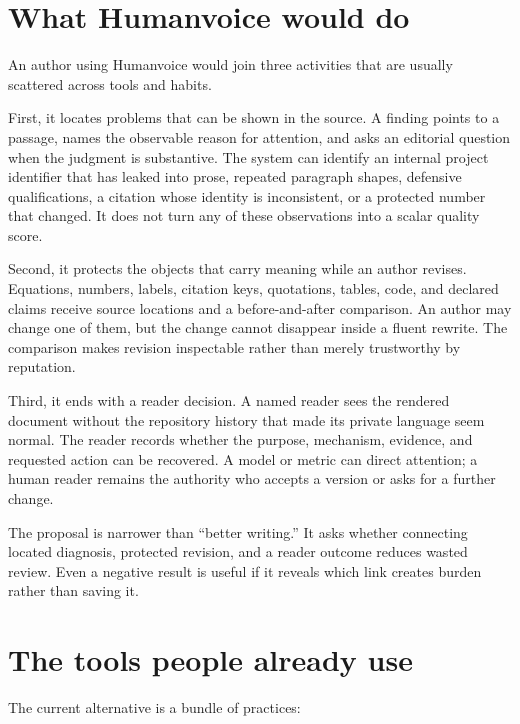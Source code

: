 \section{What Humanvoice would do}

An author using Humanvoice would join three activities that are usually
scattered across tools and habits.

First, it locates problems that can be shown in the source. A finding points to
a passage, names the observable reason for attention, and asks an editorial
question when the judgment is substantive. The system can identify an internal
project identifier that has leaked into prose, repeated paragraph shapes,
defensive qualifications, a citation whose identity is inconsistent, or a
protected number that changed. It does not turn any of these observations into
a scalar quality score.

Second, it protects the objects that carry meaning while an author revises.
Equations, numbers, labels, citation keys, quotations, tables, code, and
declared claims receive source locations and a before-and-after comparison. An
author may change one of them, but the change cannot disappear inside a fluent
rewrite. The comparison makes revision inspectable rather than merely
trustworthy by reputation.

Third, it ends with a reader decision. A named reader sees the rendered
document without the repository history that made its private language seem
normal. The reader records whether the purpose, mechanism, evidence, and
requested action can be recovered. A model or metric can direct attention; a
human reader remains the authority who accepts a version or asks for a further
change.

The proposal is narrower than ``better writing.'' It asks whether connecting
located diagnosis, protected revision, and a reader outcome reduces wasted
review. Even a negative result is useful if it reveals which link creates
burden rather than saving it.

\section{The tools people already use}

The current alternative is a bundle of practices:

